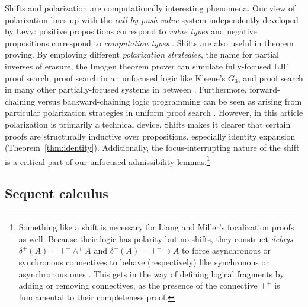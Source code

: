 \documentclass[acmtocl]{robtrans}\pdfoutput=1
\begin{document}
Shifts and polarization are computationally interesting phenomena. Our
view of polarization lines up with the {\it call-by-push-value} system
independently developed by Levy: positive propositions correspond to
{\it value types} and negative propositions correspond to {\it
  computation types} \cite{levy04call}.  Shifts are also useful in
theorem proving. By employing different {\it polarization strategies},
the name for partial inverses of erasure, the Imogen theorem prover can
simulate fully-focused LJF proof search, proof search in an unfocused
logic like Kleene's $G_3$, and proof search in many other
partially-focused systems in between \cite{mclaughlin09efficient}.
Furthermore, forward-chaining versus backward-chaining logic
programming can be seen as arising from particular polarization
strategies in uniform proof search \cite{chaudhuri10logical}. However,
in this article polarization is primarily a technical device. Shifts
makes it clearer that certain proofs are structurally inductive over
propositions, especially identity expansion
(Theorem~\ref{thm:identity}).  Additionally, the focus-interrupting
nature of the shift is a critical part of our unfocused admissibility
lemmas.\footnote{Something like a shift is necessary for Liang and
  Miller's focalization proofs as well. Because their logic has
  polarity but no shifts, they construct {\it delays} $\delta^+(A) =
  \top^+ \wedge^+ A$ and $\delta^-(A) = \top^+ \supset A$ to force
  asynchronous or synchronous connectives to behave (respectively)
  like synchronous or asynchronous ones \cite{liang09focusing}. This
  gets in the way of defining logical fragments by adding or removing
  connectives, as the presence of the connective $\top^+$ is
  fundamental to their completeness proof.}


\subsection{Sequent calculus}\label{sec:logic-scalc}
\end{document}

